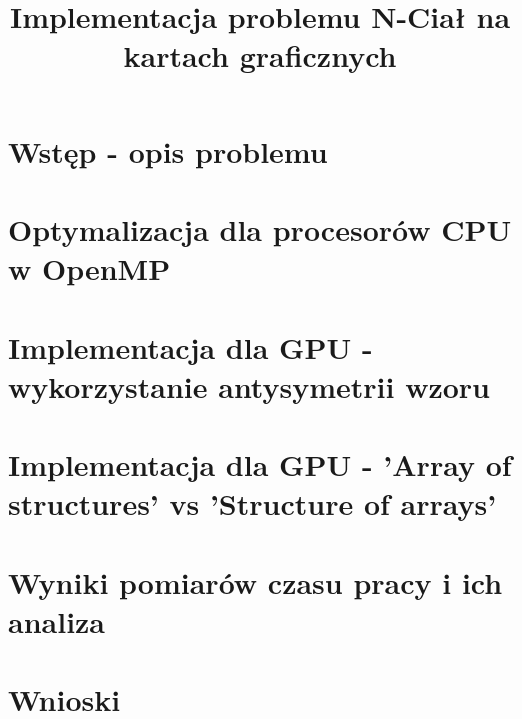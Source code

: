 \documentclass[12pt]{article}
\begin{document}
\begin{flushleft}

\title{Implementacja problemu N-Ciał na kartach graficznych}
\section { Wstęp - opis problemu }
\section { Optymalizacja dla procesorów CPU w OpenMP}
\section { Implementacja dla GPU - wykorzystanie antysymetrii wzoru }
\section { Implementacja dla GPU - 'Array of structures' vs 'Structure of arrays' }
\section { Wyniki pomiarów czasu pracy i ich analiza }
{

}
\section { Wnioski }



\end{flushleft}
\end{document}
